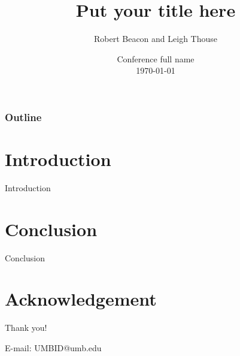 \documentclass[10pt]{beamer}
\title[Shorter Title on Each Slide]{Put your title here}%
\author[Robert Beacon]{Robert Beacon\inst{1} and Leigh Thouse \inst{1}}%
\institute[UMB]{The University of Massachusetts, Boston\inst{1}}
\date[\textcolor{white}{Conference Name, \today}]
{Conference full name\\
\today}
\begin{document}
\frame{\titlepage}
\begin{frame}
\frametitle{Outline}
\tableofcontents
\end{frame}



\section{Introduction}
\begin{frame}{Introduction}

\end{frame}


\section{Conclusion}
\begin{frame}{Conclusion}
\end{frame}

\section*{Acknowledgement}  
\begin{frame}

\textcolor{textcolor}{\huge{\centerline{Thank you!}}}
\vspace*{0.5cm}

\textcolor{textcolor}{\Large{\centerline{E-mail: UMBID@umb.edu}}}

\end{frame}
\end{document}
